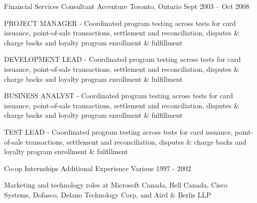 \begin{cventries}
  \cventry
    {Financial Services Consultant} %
    {Accenture} %
    {Toronto, Ontario} %
    {Sept 2003 – Oct 2008} %
    {
      \begin{cvitems} %
        \item {PROJECT MANAGER - Coordinated program testing across tests for card issuance, point-of-sale transactions, settlement and reconciliation, disputes \& charge backs and loyalty program enrollment \& fulfillment}
        \item {DEVELOPMENT LEAD - Coordinated program testing across tests for card issuance, point-of-sale transactions, settlement and reconciliation, disputes \& charge backs and loyalty program enrollment \& fulfillment}
        \item {BUSINESS ANALYST - Coordinated program testing across tests for card issuance, point-of-sale transactions, settlement and reconciliation, disputes \& charge backs and loyalty program enrollment \& fulfillment}
        \item {TEST LEAD - Coordinated program testing across tests for card issuance, point-of-sale transactions, settlement and reconciliation, disputes \& charge backs and loyalty program enrollment \& fulfillment}
      \end{cvitems}
    }

  \cventry
    {Co-op Internships} %
    {Additional Experience} %
    {Various} %
    {1997 - 2002} %
    {
      \begin{cvitems} %
        \item {Marketing and technology roles at Microsoft Canada, Bell Canada, Cisco Systems, Dofasco, Delano Technology Corp, and Aird \& Berlis LLP}
      \end{cvitems}
    }

\end{cventries}
